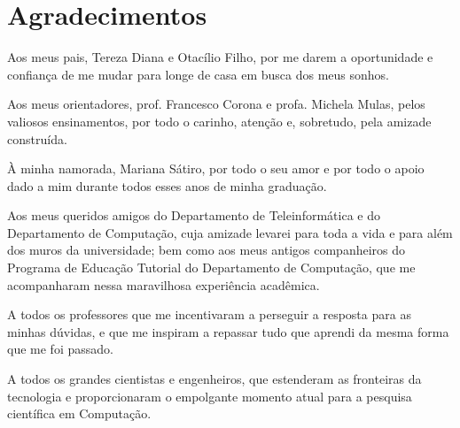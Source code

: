 \documentclass[a4paper,11pt]{book}
\numberwithin{figure}{chapter}
\numberwithin{equation}{chapter}
\numberwithin{table}{chapter}
\theoremstyle{definition}
\begin{document}
\clearpage
\thispagestyle{empty}%

\clearpage
\chapter*{Agradecimentos}
\thispagestyle{empty}

\noindent Aos meus pais, Tereza Diana e Otacílio Filho, por me darem a oportunidade e confiança de me mudar para longe de casa em busca dos meus sonhos. 

\vspace{0.6cm}

\noindent Aos meus orientadores, prof. Francesco Corona e profa. Michela Mulas, pelos valiosos ensinamentos, por todo o carinho, atenção e, sobretudo, pela amizade construída.

\vspace{0.6cm}

\noindent À minha namorada, Mariana Sátiro, por todo o seu amor e por todo o apoio dado a mim durante todos esses anos de minha graduação.

\vspace{0.6cm}

\noindent Aos meus queridos amigos do Departamento de Teleinformática e do Departamento de Computação, cuja amizade levarei para toda a vida e para além dos muros da universidade; bem como aos meus antigos companheiros do Programa de Educação Tutorial do Departamento de Computação, que me acompanharam nessa maravilhosa experiência acadêmica.

\vspace{0.6cm}

\noindent A todos os professores que me incentivaram a perseguir a resposta para as minhas dúvidas, e que me inspiram a repassar tudo que aprendi da mesma forma que me foi passado.

\vspace{0.6cm}

\noindent A todos os grandes cientistas e engenheiros, que estenderam as fronteiras da tecnologia e proporcionaram o empolgante momento atual para a pesquisa científica em Computação.

\vspace{0.6cm}
\end{document}

